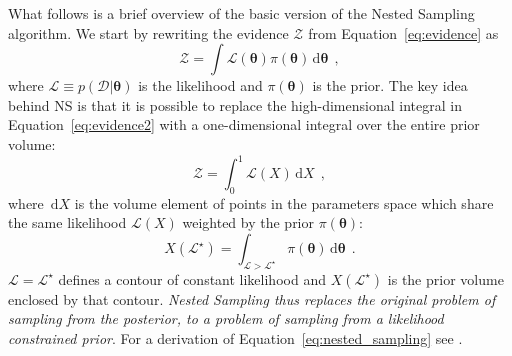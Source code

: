 \documentclass[12pt,dvipsnames]{report}
\newcommand{\ud}{\,\mathrm{d}}
\renewcommand{\vec}[1]{\boldsymbol{\mathbf{#1}}}
\newcommand{\hquad}{~~}
\begin{document}
What follows is a brief overview of the basic version of the Nested Sampling algorithm.
We start by rewriting the evidence $\mathcal{Z}$ from Equation~\ref{eq:evidence}
as 
\begin{equation}
\mathcal{Z}=\int \mathcal{L}(\vec\theta) \pi(\vec \theta)\ud\vec\theta
\hquad,
\label{eq:evidence2}
\end{equation}
where  $\mathcal{L}\equiv p(\mathcal{D}\lvert\vec \theta)$ is the likelihood 
and $\pi(\vec \theta)$ is the prior. The key idea behind NS is that it is possible 
to replace the high-dimensional integral in Equation~\ref{eq:evidence2} with 
a one-dimensional integral over the entire prior volume: 
\begin{equation}
    \mathcal{Z}=\int_{0}^{1} \mathcal{L}(X) \ud X
    \hquad,
    \label{eq:nested_sampling}
\end{equation}
where $\ud X$ is the volume element of points in the parameters space which 
share the same likelihood $\mathcal{L}(X)$ weighted by the prior $\pi(\vec\theta)$:
\begin{equation}
X\left(\mathcal{L}^{\star}\right)=\int_{\mathcal{L}>\mathcal{L}^{\star}} \pi(\vec\theta) \ud \vec\theta
\hquad.
\end{equation}
$\mathcal{L}=\mathcal{L}^\star$ defines a contour of constant likelihood and 
$X(\mathcal{L}^\star)$ is the prior volume enclosed by that contour.
\emph{Nested Sampling thus replaces the original problem of sampling from the posterior, 
to a problem of sampling from a likelihood constrained prior}.
For a derivation of Equation~\ref{eq:nested_sampling} see \citet{arXiv:2205.15570}.
\end{document}

